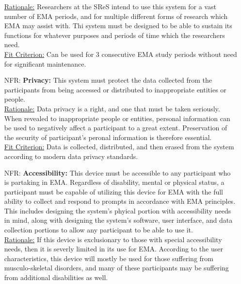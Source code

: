 \documentclass[12pt]{article}
\newcounter{nfrnum} %
\begin{document}
\begin{itemize}
\underline{Rationale:} Researchers at the SReS intend to use this system for a vast number of EMA periods, and for multiple different forms of research which EMA may assist with. Thi system must be designed to be able to sustain its functions for whatever purposes and periods of time which the researchers need.\\

\underline{Fit Criterion:} Can be used for 3 consecutive EMA study periods without need for significant maintenance.\\

\item[NFR\refstepcounter{nfrnum}\thenfrnum \label{NFR_Privacy}:]
  \textbf{Privacy:} This system must protect the data collected from the participants from being accessed or distributed to inappropriate entities or people. \\

\underline{Rationale:} Data privacy is a right, and one that must be taken seriously. When revealed to inappropriate people or entities, personal information can be used to negatively affect a participant to a great extent. Preservation of the security of participant's peronal information is therefore essential.\\

\underline{Fit Criterion:} Data is collected, distributed, and then erased from the system according to modern data privacy standards.\\

\item[NFR\refstepcounter{nfrnum}\thenfrnum \label{NFR_Accessibility}:]
  \textbf{Accessibility:} This device must be accessible to any participant who is partaking in EMA. Regardless of disability, mental or physical status, a participant must be capable of utilizing this device for EMA with the full ability to collect and respond to prompts in accordance with EMA principles. This includes designing the system's phyical portion with accessibility needs in mind, along with designing the system's software, user interface, and data collection portions to allow any participant to be able to use it.\\

\underline{Rationale:} If this device is exclusionary to those with special accessibility needs, then it is severly limited in its use for EMA. According to the user characteristics, this device will mostly be used for those suffering from musculo-skeletal disorders, and many of these participants may be suffering from additional disabilities as well.\\


\end{itemize}
\end{document}
